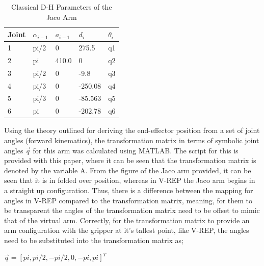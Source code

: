 \documentclass[12pt,openany,a4paper]{book}
\begin{document}



\begin{center}
\begin{table}[htb]

    \begin{tabular}{| p{2.5cm} | p{2.5cm} | p{2.5cm} | p{2.5cm} | p{2.5cm} |}
    \hline
    Joint & $\alpha_{i-1}$ & $a_{i-1}$ & $d_i$ & $\theta_{i}$ \\ \hline
     1 & pi/2 & 0 & 275.5 & q1 \\ \hline
     2 & pi & 410.0 & 0 & q2 \\ \hline
     3 & pi/2 & 0 & -9.8 & q3 \\ \hline
     4 & pi/3 & 0 & -250.08 & q4 \\ \hline
     5 & pi/3 & 0 & -85.563 & q5 \\ \hline
     6 & pi & 0 & -202.78 & q6 \\ \hline
    \end{tabular}
    \caption{Classical D-H Parameters of the Jaco Arm}
\end{table}
\end{center}


Using the theory outlined for deriving the end-effector position from a set of joint angles (forward kinematics), the transformation matrix in terms of symbolic joint angles $\vec{q}$ for this arm was calculated using MATLAB. The script for this is provided with this paper, where it can be seen that the transformation matrix is denoted by the variable A. From the figure of the Jaco arm provided, it can be seen that it is in folded over position, whereas in V-REP the Jaco arm begins in a straight up configuration. Thus, there is a difference between the mapping for angles in V-REP compared to the transformation matrix, meaning, for them to be transparent the angles of the transformation matrix need to be offset to mimic that of the virtual arm. Correctly, for the transformation matrix to provide an arm configuration with the gripper at it's tallest point, like V-REP, the angles need to be substituted into the transformation matrix as;
\vspace{\baselineskip}

\begin{center}
$\vec{q} = [ pi, pi/2, -pi/2, 0, -pi, pi]^T$
\end{center}
\vspace{\baselineskip}
\end{document}

